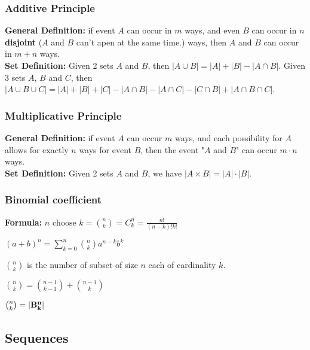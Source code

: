\documentclass[5pt]{article}
\begin{document}
\begin{multicols}{2}
\subsubsection{Additive Principle}
\textbf{General Definition:} 
if event $A$ can occur in $m$ ways, and even $B$ can occur in $n$ \textbf{disjoint} ($A$ and $B$ can't apen at the same time.) ways, then $A$ and $B$ can occur in $m+n$ ways.\\   
\textbf{Set Definition:} Given 2 sets $A$ and $B$, then $|A\cup B| = |A| + |B| - |A\cap B|$. Given 3 sets $A$, $B$ and $C$, then $|A\cup B\cup C| = |A| + |B| + |C| - |A\cap B| - |A\cap C|- |C\cap B|+|A\cap B\cap C|$.


\subsubsection{Multiplicative Principle}
\textbf{General Definition:} if event $A$ can occur $m$ ways, and each possibility for $A$ allows for exactly $n$ ways for event $B$, then the event "$A$ and $B$" can occur $m\cdot n$ ways.\\
\textbf{Set Definition:} Given 2 sets $A$ and $B$, we have $|A\times B|=|A|\cdot|B|$.


\subsubsection{Binomial coefficient}
\textbf{Formula:} $n \text{ choose } k=\binom{n}{k}=C^n_k=\frac{n!}{(n-k)!k!}$
\begin{theorem}
    $(a+b)^n=\sum^n_{k=0}\binom{n}{k}a^{n-k}b^k$
\end{theorem}
\begin{properties}
    \begin{itemize*}
        \item $\binom{n}{k}$ is the number of subset of size $n$ each of cardinality $k$.
        \item $\binom{n}{k}=\binom{n-1}{k-1}+\binom{n-1}{k}$
        \item $\binom{n}{k}=|\bf{B}^n_k|$
    \end{itemize*}
\end{properties}


\subsection{Sequences}


\end{multicols}
\end{document}
